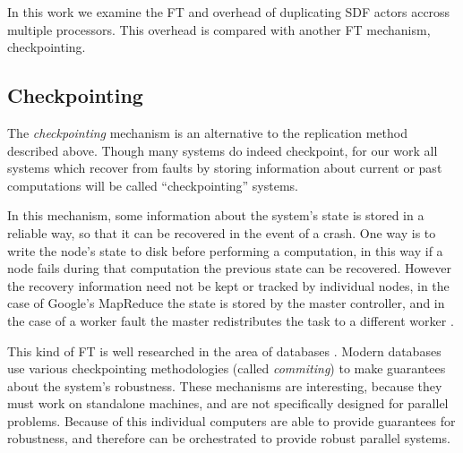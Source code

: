 In this work we examine the FT and overhead of duplicating SDF actors accross multiple processors.
This overhead is compared with another FT mechanism, checkpointing.

\subsection{Checkpointing}
The {\em checkpointing} mechanism is an alternative to the replication method described above.
Though many systems do indeed checkpoint, for our work all systems which recover from faults by storing information about current or past computations will be called ``checkpointing'' systems.

In this mechanism, some information about the system's state is stored in a reliable way, so that it can be recovered in the event of a crash.
One way is to write the node's state to disk before performing a computation, in this way if a node fails during that computation the previous state can be recovered.
However the recovery information need not be kept or tracked by individual nodes, in the case of Google's MapReduce the state is stored by the master controller, and in the case of a worker fault the master redistributes the task to a different worker \cite{dea08}.

This kind of FT is well researched in the area of databases \cite{dbrec}.
Modern databases use various checkpointing methodologies (called {\em commiting}) to make guarantees about the system's robustness.
These mechanisms are interesting, because they must work on standalone machines, and are not specifically designed for parallel problems.
Because of this individual computers are able to provide guarantees for robustness, and therefore can be orchestrated to provide robust parallel systems.